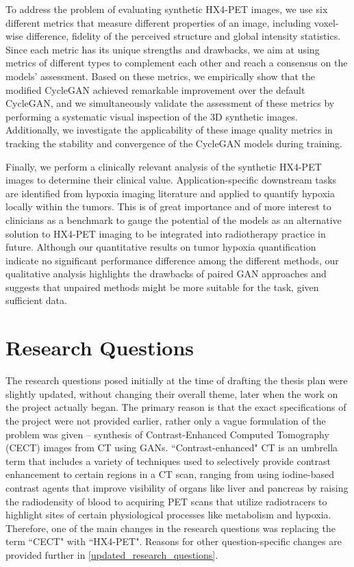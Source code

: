 To address the problem of evaluating synthetic HX4-PET images, we use six different metrics that measure different properties of an image, including voxel-wise difference, fidelity of the perceived structure and global intensity statistics. Since each metric has its unique strengths and drawbacks, we aim at using metrics of different types to complement each other and reach a consensus on the models' assessment. Based on these metrics, we empirically show that the modified CycleGAN achieved remarkable improvement over the default CycleGAN, and we simultaneously validate the assessment of these metrics by performing a systematic visual inspection of the 3D synthetic images. Additionally, we investigate the applicability of these image quality metrics in tracking the stability and convergence of the CycleGAN models during training.

Finally, we perform a clinically relevant analysis of the synthetic HX4-PET images to determine their clinical value. Application-specific downstream tasks are identified from hypoxia imaging literature and applied to quantify hypoxia locally within the tumors. This is of great importance and of more interest to clinicians as a benchmark to gauge the potential of the models as an alternative solution to HX4-PET imaging to be integrated into radiotherapy practice in future. Although our quantitative results on tumor hypoxia quantification indicate no significant performance difference among the different methods, our qualitative analysis highlights the drawbacks of paired GAN approaches and suggests that unpaired methods might be more suitable for the task, given sufficient data.



\section{Research Questions}
The research questions posed initially at the time of drafting the thesis plan were slightly updated, without changing their overall theme, later when the work on the project actually began. The primary reason is that the exact specifications of the project were not provided earlier, rather only a vague formulation of the problem was given -- synthesis of Contrast-Enhanced Computed Tomography (CECT) images from CT using GANs. ``Contrast-enhanced" CT is an umbrella term that includes a variety of techniques used to selectively provide contrast enhancement to certain regions in a CT scan, ranging from using iodine-based contrast agents that improve visibility of organs like liver and pancreas by raising the radiodensity of blood to acquiring PET scans that utilize radiotracers to highlight sites of certain physiological processes like metabolism and hypoxia. Therefore, one of the main changes in the research questions was replacing the term ``CECT" with ``HX4-PET". Reasons for other question-specific changes are provided further in \ref{updated_research_questions}.


